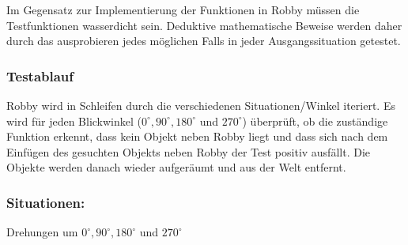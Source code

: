 Im Gegensatz zur Implementierung der Funktionen in Robby müssen die Testfunktionen wasserdicht sein. Deduktive mathematische Beweise werden daher durch das ausprobieren jedes möglichen Falls in jeder Ausgangssituation getestet.

\subsubsection*{Testablauf}
Robby wird in Schleifen durch die verschiedenen Situationen/Winkel iteriert. Es wird für jeden Blickwinkel ($0^\circ, 90^\circ, 180^\circ$ und $270^\circ$) überprüft, ob die zuständige Funktion erkennt, dass kein Objekt neben Robby liegt und dass sich nach dem Einfügen des gesuchten Objekts neben Robby der Test positiv ausfällt. Die Objekte werden danach wieder aufgeräumt und aus der Welt entfernt.

\subsubsection*{Situationen: }
Drehungen um $0^\circ, 90^\circ, 180^\circ$ und $270^\circ$
